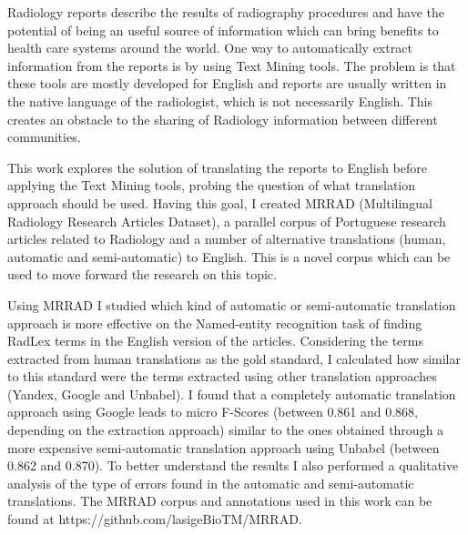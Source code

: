 \begin{abstracts}

Radiology reports describe the results of radiography procedures and have the potential of being an useful source of information which can bring benefits to health care systems around the world. One way to automatically extract information from the reports is by using Text Mining tools. The problem is that these tools are mostly developed for English and reports are usually written in the native language of the radiologist, which is not necessarily English. This creates an obstacle to the sharing of Radiology information between different communities.

This work explores the solution of translating the reports to English before applying the Text Mining tools, probing the question of what translation approach should be used. Having this goal, I created MRRAD (Multilingual Radiology Research Articles Dataset), a parallel corpus of Portuguese research articles related to Radiology and a number of alternative translations (human, automatic and semi-automatic) to English. This is a novel corpus which can be used to move forward the research on this topic.

Using MRRAD I studied which kind of automatic or semi-automatic translation approach is more effective on the Named-entity recognition task of finding RadLex terms in the English version of the articles. Considering the terms extracted from human translations as the gold standard, I calculated how similar to this standard were the terms extracted using other translation approaches (Yandex, Google and Unbabel). I found that a completely automatic translation approach using Google leads to micro F-Scores (between 0.861 and 0.868, depending on the extraction approach) similar to the ones obtained through a more expensive semi-automatic translation approach using Unbabel (between 0.862 and 0.870). To better understand the results I also performed a qualitative analysis of the type of errors found in the automatic and semi-automatic translations. The MRRAD corpus and annotations used in this work can be found at https://github.com/lasigeBioTM/MRRAD.

\end{abstracts}
